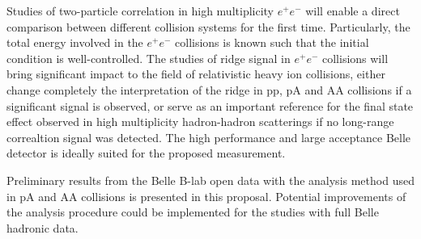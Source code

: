 Studies of two-particle correlation in high multiplicity $e^+e^-$ will enable a direct comparison between different collision systems for the first time. Particularly, the total energy involved in the $e^+e^-$ collisions is known such that the initial condition is well-controlled. The studies of ridge signal in $e^+e^-$ collisions will bring significant impact to the field of relativistic heavy ion collisions, either change completely the interpretation of the ridge in pp, pA and AA collisions if a significant signal is  observed, or serve as an important reference for the final state effect observed in high multiplicity hadron-hadron scatterings if no long-range correaltion signal was detected. The high performance and large acceptance Belle detector is ideally suited for the proposed measurement.

Preliminary results from the Belle B-lab open data with the analysis method used in pA and AA collisions is presented in this proposal. Potential improvements of the analysis procedure could be implemented for the studies with full Belle hadronic data.
